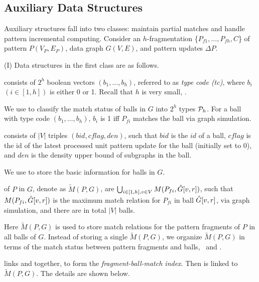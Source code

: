 \subsection{Auxiliary Data Structures}
\label{subsec-auxstr}

Auxiliary structures fall into two classes:
maintain partial matches and handle pattern incremental computing. Consider an $h$-fragmentation \{$P_{f1}, \ldots, P_{fh}, C$\} of pattern $P(V_P, E_P)$, data graph $G(V, E)$, and pattern updates $\Delta P$.


\stab(I) Data structures in the first class are as follows.

 consists of $2^h$ boolean vectors $(b_1,\ldots,b_h)$, referred to as {\em type code (tc)}, where $b_i$ $(i\in [1,h])$ is either 0 or 1. Recall that $h$ is very small, .

We use \fs to classify the match status of balls in $G$ into $2^h$ types \wrt ${\cal P}_h$.
For a ball with type code $(b_1,\ldots,b_h)$, $b_i$ is 1 iff $P_{fi}$ matches the ball via graph simulation.

\vspace{0.4ex}
 consists of $|V|$ triples $(bid, cflag, den)$, such that $bid$ is the $id$ of a ball,
$cflag$ is the id of the latest processed unit pattern update for the ball (initially set to $0$),
and $den$ is the density upper bound of subgraphs in the ball.

We use \bs to store the basic information for balls in $G$.

\vspace{0.4ex}
 of $P$ in $G$, denote as $\tilde{M}(P,G)$,
are $\bigcup_{i\in[1,h], v\in V} M(P_{fi},\hat{G}{[v,r]})$,
such that $M(P_{fi},\hat{G}{[v,r]})$ is the maximum match relation for $P_{fi}$ in ball $\hat{G}{[v,r]}$, via graph simulation,
and there are in total $|V|$ balls.

Here $\tilde{M}(P,G)$ is used to store match relations for the pattern fragments of $P$ in all balls of $G$. Instead of storing a single $\tilde{M}(P, G)$, we organize $\tilde{M}(P, G)$ in terms of the match status between pattern fragments and balls, \ie\ \fs and \bs.

\vspace{0.4ex}
 links \fs and \bs together, to form the {\em fragment-ball-match index}. Then \fb is linked to $\tilde{M}(P,G)$. The details are shown below.

